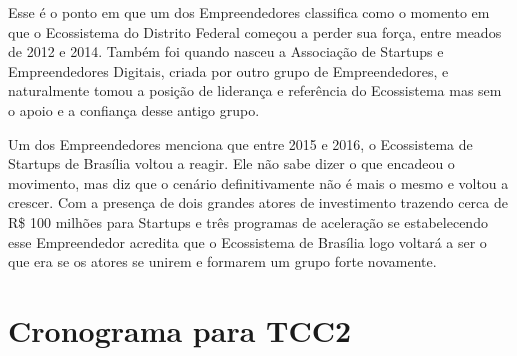 Esse é o ponto em que um dos Empreendedores classifica como o momento em que o Ecossistema do Distrito Federal começou a perder sua força, entre meados de 2012 e 2014. Também foi quando nasceu a Associação de Startups e Empreendedores Digitais, criada por outro grupo de Empreendedores, e naturalmente tomou a posição de liderança e referência do Ecossistema mas sem o apoio e a confiança desse antigo grupo.

Um dos Empreendedores menciona que entre 2015 e 2016, o Ecossistema de Startups de Brasília voltou a reagir. Ele não sabe dizer o que encadeou o movimento, mas diz que o cenário definitivamente não é mais o mesmo e voltou a crescer. Com a presença de dois grandes atores de investimento trazendo cerca de R\$ 100 milhões para Startups e três programas de aceleração se estabelecendo esse Empreendedor acredita que o Ecossistema de Brasília logo voltará a ser o que era se os atores se unirem e formarem um grupo forte novamente.

\section{Cronograma para TCC2}
\label{section:cronograma_tcc2}

